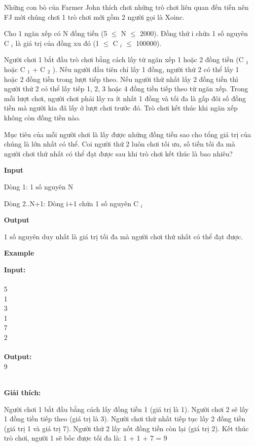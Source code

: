 















   Những con bò của Farmer John thích chơi những trò chơi liên quan đến tiền nên FJ mời chúng chơi 1 trò chơi mới gồm 2 người gọi là Xoinc.  

   Cho 1 ngăn xếp có N đồng tiền (5  $\le$  N  $\le$  2000). Đồng thứ i chứa 1 số nguyên C   $_    i   $   là giá trị của đồng xu đó (1  $\le$  C   $_    i   $    $\le$  100000).  

   Người chơi 1 bắt đầu trò chơi bằng cách lấy từ ngăn xếp 1 hoặc 2 đồng tiền (C   $_    1   $   hoặc C   $_    1   $   + C   $_    2   $   ). Nếu người đầu tiên chỉ lấy 1 đồng, người thứ 2 có thể lấy 1 hoặc 2 đồng tiền trong lượt tiếp theo. Nếu người thứ nhất lấy 2 đồng tiền thì người thứ 2 có thể lấy tiếp 1, 2, 3 hoặc 4 đồng tiền tiếp theo từ ngăn xếp. Trong mỗi lượt chơi, người chơi phải lấy ra ít nhất 1 đồng và tối đa là gấp đôi số đồng tiền mà người kia đã lấy ở lượt chơi trước đó. Trò chơi kết thúc khi ngăn xếp không còn đồng tiền nào.  

   Mục tiêu của mỗi người chơi là lấy được những đồng tiền sao cho tổng giá trị của chúng là lớn nhất có thể. Coi người thứ 2 luôn chơi tối ưu, số tiền tối đa mà người chơi thứ nhất có thể đạt được sau khi trò chơi kết thúc là bao nhiêu?  



\textbf{    Input   }

   Dòng 1: 1 số nguyên N  

   Dòng 2..N+1: Dòng i+1 chứa 1 số nguyên C   $_    i   $

\textbf{    Output   }

   1 số nguyên duy nhất là giá trị tối đa mà người chơi thứ nhất có thể đạt được.  

\textbf{    Example   }

\textbf{    Input:   }
\\
\\   5   
\\   1   
\\   3   
\\   1   
\\   7   
\\   2   
\\
\\\textbf{    Output:   }
\\   9   
\\
\\\textbf{}

\textbf{     Giải thích:    }

   Người chơi 1 bắt đầu bằng cách lấy đồng tiền 1 (giá trị là 1). Người chơi 2 sẽ lấy 1 đồng tiền tiếp theo (giá trị là 3). Người chơi thứ nhất tiếp tục lấy 2 đồng tiền (giá trị 1 và giá trị 7). Người thứ 2 lấy nốt đồng tiền còn lại (giá trị 2). Kết thúc trò chơi, người 1 sẽ bốc được tối đa là: 1 + 1 + 7 = 9  

